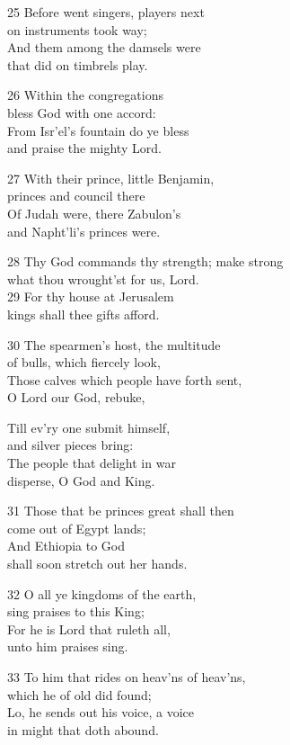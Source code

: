 25 Before went singers, players next\\
on instruments took way;\\
And them among the damsels were\\
that did on timbrels play.

26 Within the congregations\\
bless God with one accord:\\
From Isr’el’s fountain do ye bless\\
and praise the mighty Lord.

27 With their prince, little Benjamin,\\
princes and council there\\
Of Judah were, there Zabulon’s\\
and Napht’li’s princes were.

28 Thy God commands thy strength; make strong\\
what thou wrought’st for us, Lord.\\
29 For thy house at Jerusalem\\
kings shall thee gifts afford.

30 The spearmen’s host, the multitude\\
of bulls, which fiercely look,\\
Those calves which people have forth sent,\\
O Lord our God, rebuke,

Till ev’ry one submit himself,\\
and silver pieces bring:\\
The people that delight in war\\
disperse, O God and King.

31 Those that be princes great shall then\\
come out of Egypt lands;\\
And Ethiopia to God\\
shall soon stretch out her hands.

32 O all ye kingdoms of the earth,\\
sing praises to this King;\\
For he is Lord that ruleth all,\\
unto him praises sing.

33 To him that rides on heav’ns of heav’ns,\\
which he of old did found;\\
Lo, he sends out his voice, a voice\\
in might that doth abound.

